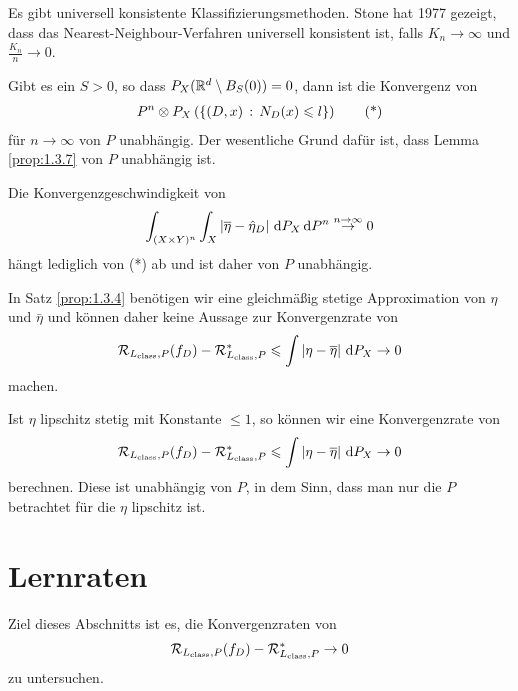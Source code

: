 \begin{bem*}[Schlussbemerkungen]
\begin{bemenum}
\item Es gibt universell konsistente Klassifizierungsmethoden. Stone hat 1977
gezeigt, dass das Nearest-Neighbour-Verfahren universell konsistent ist, falls
$K_n\to \infty$ und $\frac{K_n}{n}\to 0$.
\item Gibt es ein $S>0$, so dass $P_X(\mathbb{R}^d\setminus B_S(0)) = 0$, dann ist die
Konvergenz von
\begin{align*}
P^n\otimes P_X\left(\left\{ (D,x)\,:\,N_D(x)\leqslant l\right\} \right)\tag{*}
\end{align*}
für $n\to\infty$ von $P$ unabhängig. Der wesentliche Grund dafür ist, dass
Lemma \ref{prop:1.3.7} von $P$ unabhängig ist.
\item Die Konvergenzgeschwindigkeit von
\begin{align*}
\int_{(X\times Y)^n}\int_X \left|{\overline{\eta}}-\hat{\eta}_D\right|\,\mathrm{d} P_X\,\mathrm{d} P^n
\overset{n\to\infty}{\to} 0
\end{align*}
hängt lediglich von (*) ab und ist daher von $P$ unabhängig.
\item In Satz \ref{prop:1.3.4} benötigen wir eine gleichmäßig stetige
Approximation von $\eta$ und $\bar{\eta}$ und können daher keine Aussage zur
Konvergenzrate von
\begin{align*}
\mathcal{R}_{L_{\mathrm{class}},P}(f_D) - \mathcal{R}_{L_{\mathrm{class}},P}^*
\leqslant \int \left|\eta-{\overline{\eta}}\right|\,\mathrm{d} P_X \to 0
\end{align*}
machen.
\item Ist $\eta$ lipschitz stetig mit Konstante $\le 1$, so können wir eine
Konvergenzrate von
\begin{align*}
\mathcal{R}_{L_{\mathrm{class}},P}(f_D) - \mathcal{R}_{L_{\mathrm{class}},P}^*
\leqslant \int \left|\eta-{\overline{\eta}}\right|\,\mathrm{d} P_X \to 0
\end{align*}
berechnen.
Diese ist unabhängig von $P$, in dem Sinn, dass man nur die $P$
betrachtet für die $\eta$ lipschitz ist.\maphere 
\end{bemenum}
\end{bem*}

\section{Lernraten}

Ziel dieses Abschnitts ist es, die Konvergenzraten von
\begin{align*}
\mathcal{R}_{L_{\mathrm{class}},P}(f_D) - \mathcal{R}_{L_{\mathrm{class}},P}^*\to 0
\end{align*}
zu untersuchen.

